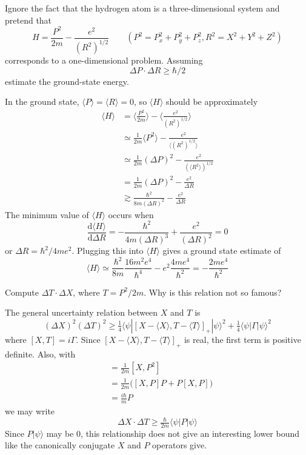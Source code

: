 \documentclass[../principles-of-quantum-mechanics.tex]{subfiles}
\begin{document}
\begin{questions}
		\question Ignore the fact that the hydrogen atom is a three-dimensional system and pretend that
		$$H = \frac{P^2}{2m} - \frac{e^2}{(R^2)^{1/2}}\qquad (P^2 = P_x^2 + P_y^2 + P_z^2, R^2 = X^2 + Y^2 + Z^2)$$
		corresponds to a one-dimensional problem. Assuming
		$$\Delta P \cdot \Delta R \geq \hbar/2$$
		estimate the ground-state energy.
		\begin{solution}
			In the ground state, $\langle P\rangle = \langle R \rangle = 0$, so $\langle H\rangle$ should be approximately
			\begin{align*}
				\langle H\rangle &= \Big\langle\frac{P^2}{2m}\Big\rangle - \Big\langle\frac{e^2}{(R^2)^{1/2}}\Big\rangle \\
				&\simeq \frac{1}{2m}\langle P^2\rangle - \frac{e^2}{\langle (R^2)^{1/2}\rangle} \\
				&\simeq \frac{1}{2m}(\Delta P)^2 - \frac{e^2}{(\langle R^2\rangle)^{1/2}} \\
				&= \frac{1}{2m}(\Delta P)^2 - \frac{e^2}{\Delta R} \\
				&\gtrsim \frac{\hbar^2}{8m(\Delta R)^2} - \frac{e^2}{\Delta R}
			\end{align*}
			The minimum value of $\langle H\rangle$ occurs when
			$$\frac{\mathrm{d}\langle H\rangle}{\mathrm{d}\Delta R} = -\frac{\hbar^2}{4m(\Delta R)^3} + \frac{e^2}{(\Delta R)^2} = 0$$
			or $\Delta R = \hbar^2/4me^2$. Plugging this into $\langle H\rangle$ gives a ground state estimate of
			$$\langle H\rangle \simeq \frac{\hbar^2}{8m}\frac{16m^2e^4}{\hbar^4} - e^2\frac{4me^4}{\hbar^2} = {-\frac{2me^4}{\hbar^2}}$$
		\end{solution}
		
		\question Compute $\Delta T \cdot \Delta X$, where $T = P^2/2m$. Why is this relation not so famous?
		\begin{solution}
			The general uncertainty relation between $X$ and $T$ is
			$$(\Delta X)^2(\Delta T)^2 \geq \tfrac{1}{4}\langle \psi|[X - \langle X\rangle, T - \langle T \rangle]_+|\psi\rangle^2 + \tfrac{1}{4}\langle \psi|\Gamma|\psi\rangle^2$$
			where $[X, T] = i\Gamma$. Since $[X - \langle X\rangle, T - \langle T \rangle]_+$ is real, the first term is positive definite. Also, with
			\begin{align*}
				[X, T] &= \frac{1}{2m}[X, P^2] \\
				&= \frac{1}{2m}\big([X, P]P + P[X, P]\big) \\
				&= \frac{i\hbar}{m}P
			\end{align*}
			we may write
			$$\Delta X \cdot \Delta T \geq \tfrac{\hbar}{2m}\langle \psi|P|\psi\rangle$$
			Since $P|\psi\rangle$ may be $0$, this relationship does not give an interesting lower bound like the canonically conjugate $X$ and $P$ operators give.
		\end{solution}
	\end{questions}
\end{document}
